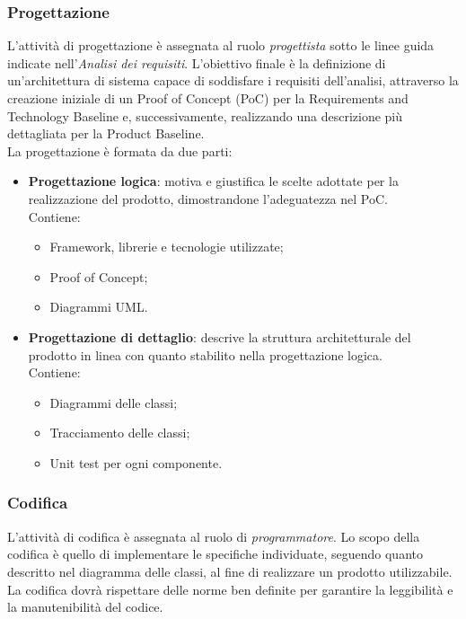         \subsubsection{Progettazione}
        L'attività di progettazione è assegnata al ruolo \textit{progettista} sotto le linee guida indicate nell'\textit{Analisi dei requisiti}. L'obiettivo finale è la definizione di un'architettura di sistema capace di soddisfare i requisiti dell'analisi, 
        attraverso la creazione iniziale di un Proof of Concept (PoC) per la Requirements and Technology Baseline e, successivamente, realizzando una descrizione più dettagliata per la Product Baseline.
        \\La progettazione è formata da due parti:
        \begin{itemize}
            \item \textbf{Progettazione logica}: motiva e giustifica le scelte adottate per la realizzazione del prodotto, dimostrandone l’adeguatezza nel PoC.
            \\Contiene:
            \renewcommand{\labelitemii}{-}
            \begin{itemize}
                \item Framework, librerie e tecnologie utilizzate;
                \item Proof of Concept;
                \item Diagrammi UML.
            \end{itemize}
            \item \textbf{Progettazione di dettaglio}: descrive la struttura architetturale del prodotto in linea con quanto stabilito nella progettazione logica.\\
            Contiene:
            \renewcommand{\labelitemii}{-}
            \begin{itemize}
                \item Diagrammi delle classi;
                \item Tracciamento delle classi;
                \item Unit test per ogni componente.
            \end{itemize}
        \end{itemize}
        
        \subsubsection{Codifica}
        L'attività di codifica è assegnata al ruolo di \textit{programmatore}. Lo scopo della codifica è quello di implementare le specifiche individuate, seguendo quanto descritto nel diagramma delle classi, al fine di realizzare un prodotto utilizzabile.
        \\La codifica dovrà rispettare delle norme ben definite per garantire la leggibilità e la manutenibilità del codice.







